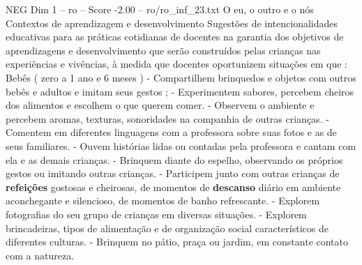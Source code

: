 \begin{textsample}{NEG Dim 1 – ro – Score -2.00 – ro/ro\_inf\_23.txt}  \label{ex:f1_neg_151}
O eu, o outro e o nós Contextos de aprendizagem e desenvolvimento Sugestões de intencionalidades educativas para as práticas cotidianas de docentes na garantia dos objetivos de aprendizagens e desenvolvimento que serão construídos pelas crianças nas experiências e vivências, à medida que docentes oportunizem situações em que : Bebês ( zero a 1 ano e 6 meses ) - Compartilhem brinquedos e objetos com outros bebês e adultos e imitam seus gestos ; - Experimentem sabores, percebem cheiros dos alimentos e escolhem o que querem comer. - Observem o ambiente e percebem aromas, texturas, sonoridades na companhia de outras crianças. - Comentem em diferentes linguagens com a professora sobre suas fotos e as de seus familiares. - Ouvem histórias lidas ou contadas pela professora e cantam com ela e as demais crianças. - Brinquem diante do espelho, observando os próprios gestos ou imitando outras crianças. - Participem junto com outras crianças de \textbf{refeições} gostosas e cheirosas, de momentos de \textbf{descanso} diário em ambiente aconchegante e silencioso, de momentos de banho refrescante. - Explorem fotografias do seu grupo de crianças em diversas situações. - Explorem brincadeiras, tipos de alimentação e de organização social característicos de diferentes culturas. - Brinquem no pátio, praça ou jardim, em constante contato com a natureza.

\end{textsample}
